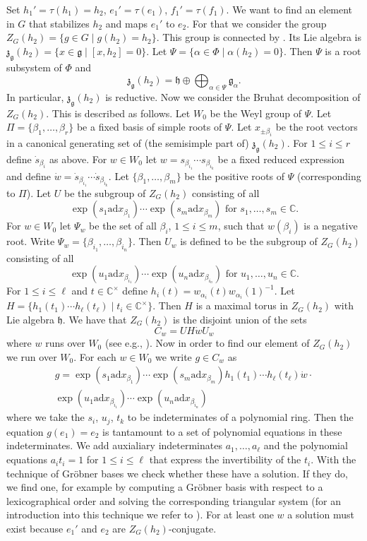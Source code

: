 \documentclass[a4paper,10pt]{amsart}
\newcommand{\C}{\mathbb{C}}
\newcommand{\mf}{\mathfrak}
\newcommand{\g}{\mf{g}}
\newcommand{\h}{\mf{h}}
\newcommand{\z}{\mf{z}}
\newcommand{\ad}{\mathrm{ad}}
\numberwithin{equation}{section}
\theoremstyle{remark}
\theoremstyle{remark}
\begin{document}
Set $h_1'=\tau(h_1)=h_2$, $e_1'=\tau(e_1)$, $f_1'=\tau(f_1)$. We want to find
an element in $G$ that stabilizes $h_2$ and maps $e_1'$ to $e_2$. For that
we consider the
group $Z_G(h_2) = \{ g\in G \mid g(h_2) = h_2\}$. This group is connected
by \cite[Corollary 3.11]{steinberg75}. Its Lie algebra is
$\z_\g(h_2) = \{ x\in \g \mid [x,h_2]=0\}$. Let $\Psi = \{\alpha\in \Phi
\mid \alpha(h_2) = 0\}$. Then $\Psi$ is a root subsystem of $\Phi$ and 
$$\z_\g(h_2) = \h \oplus \bigoplus_{\alpha\in\Psi} \g_\alpha.$$
In particular, $\z_\g(h_2)$ is reductive. Now we consider the Bruhat
decomposition of $Z_G(h_2)$. This is described as follows.
Let $W_0$ be the Weyl group of $\Psi$. Let $\Pi = \{\beta_1,\ldots,
\beta_r\}$ be a fixed basis of simple roots of $\Psi$. Let $x_{\pm \beta_i}$ be
the root vectors in a canonical generating set of (the semisimple part of)
$\z_\g(h_2)$. For $1\leq i\leq r$ define $\dot{s}_{\beta_i}$ as above. For
$w\in W_0$ let $w=s_{\beta_{i_1}}\cdots s_{\beta_{i_k}}$ be a fixed reduced
expression and define $\dot{w} = \dot{s}_{\beta_{i_1}}\cdots \dot{s}_{\beta_{i_k}}$.
Let $\{\beta_1,\ldots,\beta_m\}$ be the positive roots of $\Psi$
(corresponding to $\Pi$). Let $U$ be the subgroup of $Z_G(h_2)$ consisting of
all
$$\exp(s_1 \ad x_{\beta_1})\cdots \exp(s_m \ad x_{\beta_m}) \text{ for }
s_1,\ldots,s_m\in \C.$$
For $w\in W_0$ let $\Psi_w$ be the set of all $\beta_i$, $1\leq i\leq m$,
such that $w(\beta_i)$ is a negative root. Write $\Psi_w = \{\beta_{i_1},
\ldots,\beta_{i_n}\}$. Then $U_w$ is defined to be the subgroup of $Z_G(h_2)$
consisting of all
$$\exp(u_1 \ad x_{\beta_{i_1}})\cdots \exp(u_n \ad x_{\beta_{i_n}}) \text{ for }
u_1,\ldots,u_n\in \C.$$
For $1\leq i\leq \ell$ and $t\in \C^\times$ define $h_i(t) = w_{\alpha_i}(t)
w_{\alpha_i}(1)^{-1}$. Let $H = \{h_1(t_1)\cdots h_\ell(t_\ell) \mid
t_i\in \C^\times\}$. Then $H$ is a maximal torus in $Z_G(h_2)$ with Lie
algebra $\h$. We have that $Z_G(h_2)$ is the disjoint union of the sets
$$C_w= UH\dot{w} U_w$$
where $w$ runs over $W_0$ (see e.g.,
\cite[Proposition 5.1.10, Theorem 5.8.3]{gra16}). Now in order to find our
element of $Z_G(h_2)$ we run over $W_0$. For each $w\in W_0$ we write
$g\in C_w$ as
\begin{multline*}
g=\exp(s_1 \ad x_{\beta_1})\cdots \exp(s_m \ad x_{\beta_m})h_1(t_1)\cdots
h_\ell(t_\ell) \dot{w}\cdot\\
\exp(u_1 \ad x_{\beta_{i_1}})\cdots \exp(u_n \ad x_{\beta_{i_n}})
\end{multline*}
where we take the $s_i$, $u_j$, $t_k$ to be indeterminates of
a polynomial ring. Then the equation $g(e_1)=e_2$ is tantamount to
a set of polynomial equations in these indeterminates. We add auxialiary
indeterminates $a_1,\ldots,a_\ell$ and the polynomial equations $a_it_i=1$ for
$1\leq i\leq \ell$ that express the invertibility of the $t_i$.
With the technique of Gr\"obner bases we check whether these have a solution.
If they do, we
find one, for example by computing a Gr\"obner basis with respect to
a lexicographical order and solving the corresponding triangular system
(for an introduction into this technique we refer to \cite[\S 3.1]{clo}). 
For at least one $w$ a solution must exist because $e_1'$ and $e_2$ are
$Z_G(h_2)$-conjugate.
\end{document}
